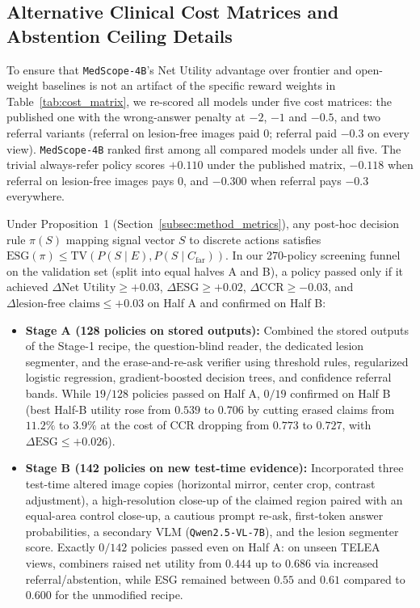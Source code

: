 \documentclass{article} %
\begin{document}
\subsection{Alternative Clinical Cost Matrices and Abstention Ceiling Details}
To ensure that \texttt{MedScope-4B}'s Net Utility advantage over frontier and open-weight baselines is not an artifact of the specific reward weights in Table~\ref{tab:cost_matrix}, we re-scored all models under five cost matrices: the published one with the wrong-answer penalty at $-2$, $-1$ and $-0.5$, and two referral variants (referral on lesion-free images paid $0$; referral paid $-0.3$ on every view). \texttt{MedScope-4B} ranked first among all compared models under all five. The trivial always-refer policy scores $+0.110$ under the published matrix, $-0.118$ when referral on lesion-free images pays $0$, and $-0.300$ when referral pays $-0.3$ everywhere.

Under Proposition~1 (Section~\ref{subsec:method_metrics}), any post-hoc decision rule $\pi(S)$ mapping signal vector $S$ to discrete actions satisfies $\text{ESG}(\pi) \le \text{TV}(P(S \mid E), P(S \mid C_{\text{far}}))$. In our 270-policy screening funnel on the validation set (split into equal halves A and B), a policy passed only if it achieved $\Delta\text{Net Utility} \ge +0.03$, $\Delta\text{ESG} \ge +0.02$, $\Delta\text{CCR} \ge -0.03$, and $\Delta\text{lesion-free claims} \le +0.03$ on Half A and confirmed on Half B:
\begin{itemize}[leftmargin=*,nosep]
    \item \textbf{Stage A (128 policies on stored outputs):} Combined the stored outputs of the Stage-1 recipe, the question-blind reader, the dedicated lesion segmenter, and the erase-and-re-ask verifier using threshold rules, regularized logistic regression, gradient-boosted decision trees, and confidence referral bands. While $19/128$ policies passed on Half A, $0/19$ confirmed on Half B (best Half-B utility rose from $0.539$ to $0.706$ by cutting erased claims from $11.2\%$ to $3.9\%$ at the cost of CCR dropping from $0.773$ to $0.727$, with $\Delta\text{ESG} \le +0.026$).
    \item \textbf{Stage B (142 policies on new test-time evidence):} Incorporated three test-time altered image copies (horizontal mirror, center crop, contrast adjustment), a high-resolution close-up of the claimed region paired with an equal-area control close-up, a cautious prompt re-ask, first-token answer probabilities, a secondary VLM (\texttt{Qwen2.5-VL-7B}), and the lesion segmenter score. Exactly $0/142$ policies passed even on Half A: on unseen TELEA views, combiners raised net utility from $0.444$ up to $0.686$ via increased referral/abstention, while ESG remained between $0.55$ and $0.61$ compared to $0.600$ for the unmodified recipe.
\end{itemize}
\end{document}
